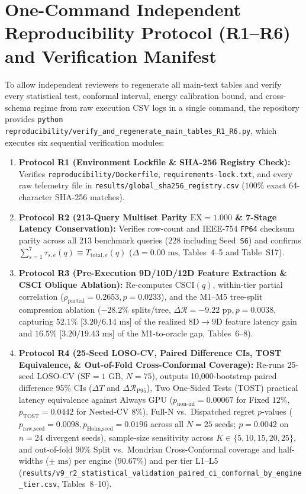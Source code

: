 \documentclass[10pt,a4paper]{article}
\begin{document}
\begin{table}[!htbp]
{\begin{tabular}{@{}lccccccccc@{}}
\end{tabular}%
}
\end{table}

\section{One-Command Independent Reproducibility Protocol (R1--R6) and Verification Manifest}
To allow independent reviewers to regenerate all main-text tables and verify every statistical test, conformal interval, energy calibration bound, and cross-schema regime from raw execution CSV logs in a single command, the repository provides \texttt{python reproducibility/verify\_and\_regenerate\_main\_tables\_R1\_R6.py}, which executes six sequential verification modules:
\begin{enumerate}[leftmargin=1.5em,itemsep=2pt]
    \item \textbf{Protocol R1 (Environment Lockfile \& SHA-256 Registry Check):} Verifies \texttt{reproducibility/Dockerfile}, \texttt{requirements-lock.txt}, and every raw telemetry file in \texttt{results/global\_sha256\_registry.csv} ($100\%$ exact 64-character SHA-256 matches).
    \item \textbf{Protocol R2 (213-Query Multiset Parity $\text{EX}=1.000$ \& 7-Stage Latency Conservation):} Verifies row-count and IEEE-754 \texttt{FP64} checksum parity across all $213$ benchmark queries ($228$ including Seed~\texttt{S6}) and confirms $\sum_{s=1}^7 \tau_{s,e}(q) \equiv T_{\text{total},e}(q)$ ($\Delta = 0.00\text{ ms}$, Tables~4--5 and Table~S17).
    \item \textbf{Protocol R3 (Pre-Execution 9D/10D/12D Feature Extraction \& CSCI Oblique Ablation):} Re-computes $\text{CSCI}(q)$, within-tier partial correlation ($\rho_{\text{partial}}=0.2653, p=0.0233$), and the M1--M5 tree-split compression ablation ($-28.2\%$ splits/tree, $\Delta\mathcal{R}=-9.22\text{ pp}, p=0.0038$, capturing $52.1\%$ [$3.20 / 6.14\text{ ms}$] of the realized $8\text{D}\rightarrow 9\text{D}$ feature latency gain and $16.5\%$ [$3.20 / 19.43\text{ ms}$] of the M1-to-oracle gap, Tables~6--8).
    \item \textbf{Protocol R4 (25-Seed LOSO-CV, Paired Difference CIs, TOST Equivalence, \& Out-of-Fold Cross-Conformal Coverage):} Re-runs 25-seed LOSO-CV ($\text{SF}=1\text{ GB}$, $N=75$), outputs 10,000-bootstrap paired difference 95\% CIs ($\Delta T$ and $\Delta\mathcal{R}_{\text{P95}}$), Two One-Sided Tests (TOST) practical latency equivalence against Always GPU ($p_{\text{non-inf}}=0.00067$ for Fixed $12\%$, $p_{\text{TOST}}=0.0442$ for Nested-CV $8\%$), Full-N vs.\ Dispatched regret $p$-values ($p_{\text{raw,seed}}=0.0098, p_{\text{Holm,seed}}=0.0196$ across all $N=25$ seeds; $p=0.0042$ on $n=24$ divergent seeds), sample-size sensitivity across $K \in \{5,10,15,20,25\}$, and out-of-fold $90\%$ Split vs.\ Mondrian Cross-Conformal coverage and half-widths ($\pm\text{ ms}$) per engine ($90.67\%$) and per tier L1--L5 (\texttt{results/v9\_r2\_statistical\_validation\_paired\_ci\_conformal\_by\_engine\_tier.csv}, Tables~8--10).

\end{enumerate}
\end{document}
